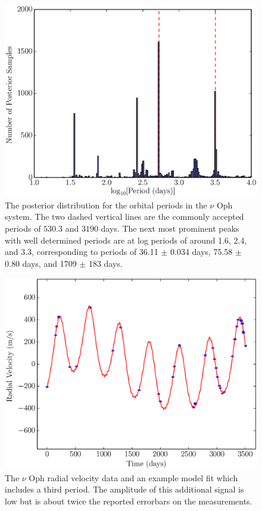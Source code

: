 \documentclass[useAMS,usenatbib]{mn2e}
\begin{document}
\begin{figure}
\includegraphics[scale=0.45]{Figures/nu_oph_periods.eps}
\caption{The posterior distribution for the orbital periods in the $\nu$ Oph
system. The two dashed vertical lines are the commonly accepted periods
of $530.3$ and $3190$ days. The next most prominent peaks with well determined
periods are at log periods of around 1.6, 2.4, and 3.3, corresponding to
periods of 36.11 $\pm$ 0.034 days,
75.58 $\pm$ 0.80 days, and 1709 $\pm$ 183 days.\label{fig:nu_oph_periods}}
\end{figure}

\begin{figure}
\includegraphics[scale=0.45]{Figures/nuoph.eps}
\caption{The $\nu$ Oph radial velocity data and an example model fit which
includes a third period. The amplitude of this additional signal is low but
is about twice the reported errorbars on the measurements.\label{fig:nuoph}}
\end{figure}
\end{document}
